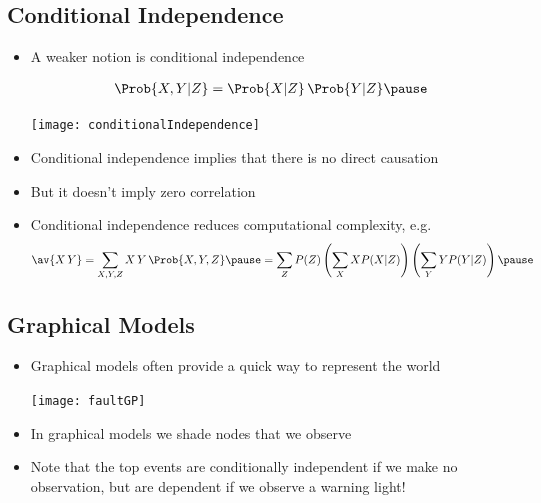 \begin{slide}
\section[-1]{Conditional Independence}

\begin{PauseHighLight}
  \begin{itemize}
  \item A weaker notion is conditional independence
    \begin{minipage}{0.68\linewidth}
      \begin{align*}
        \Prob{X,Y|Z} = \Prob{X|Z} \, \Prob{Y|Z}\pause
      \end{align*}
    \end{minipage}\hfil
    \begin{minipage}{0.18\linewidth}
      \begin{center}
        \texttt{[image: conditionalIndependence]}
      \end{center}
    \end{minipage}
  \item Conditional independence implies that there is no direct
    causation\pause
  \item But it doesn't imply zero correlation\pause
  \item Conditional independence reduces computational complexity, e.g.
    {\small \begin{align*}
      \av{X\,Y} = \sum_{X,Y,Z} X\,Y \, \Prob{X, Y, Z} \pause
      = \sum_Z P(Z) \left(\sum_X X P(X|Z) \right)  \left(\sum_Y Y P(Y|Z)
      \right)\pause
    \end{align*}}
  \end{itemize}
\end{PauseHighLight}

\end{slide}


\begin{slide}
\section{Graphical Models}

\begin{PauseHighLight}
  \begin{itemize}
  \item Graphical models often provide a quick way to represent the
    world\pause
    \begin{center}
      \texttt{[image: faultGP]}
    \end{center}
  \item In graphical models we shade nodes that we observe\pause
  \item Note that the top events are conditionally independent if we make
    no observation, but are dependent if we observe a warning
    light!\pause
  \end{itemize}
\end{PauseHighLight}

\end{slide}

